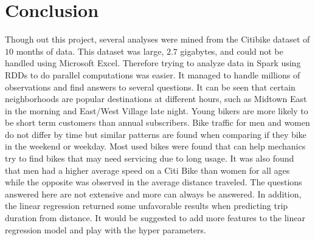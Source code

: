 \documentclass{article}
\begin{document}
\newpage
\section{Conclusion} 
Though out this project, several analyses were mined from the Citibike dataset of $10$ months of data. This dataset was large, $2.7$ gigabytes, and could not be handled using Microsoft Excel. Therefore trying to analyze data in Spark using RDDs to do parallel computations was easier. It managed to handle millions of observations and find answers to several questions. It can be seen that certain neighborhoods are popular destinations at different hours, such as Midtown East in the morning and East/West Village late night. Young bikers are more likely to be short term customers than annual subscribers. Bike traffic for men and women do not differ by time but similar patterns are found when comparing if they bike in the weekend or weekday. Most used bikes were found that can help mechanics try to find bikes that may need servicing due to long usage. It was also found that men had a higher average speed on a Citi Bike than women for all ages while the opposite was observed in the average distance traveled. The questions answered here are not extensive and more can always be answered. In addition, the linear regression returned some unfavorable results when predicting trip duration from distance. It would be suggested to add more features to the linear regression model and play with the hyper parameters. 
\end{document}
